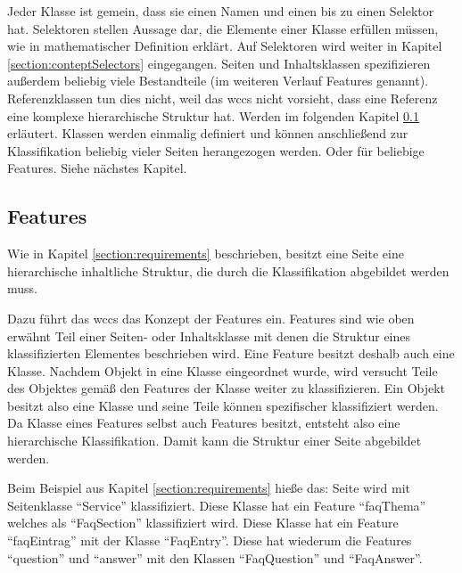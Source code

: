         Jeder Klasse ist gemein, dass sie einen Namen und einen bis zu einen Selektor hat.
        Selektoren stellen Aussage dar, die Elemente einer Klasse erfüllen müssen,
        wie in mathematischer Definition erklärt.
        Auf Selektoren wird weiter in Kapitel \ref{section:conteptSelectors} eingegangen.
        Seiten und Inhaltsklassen spezifizieren außerdem beliebig viele Bestandteile
        (im weiteren Verlauf Features genannt).
        Referenzklassen tun dies nicht, weil das \gls{wccs} nicht vorsieht, dass eine Referenz eine komplexe hierarchische Struktur hat.
        Werden im folgenden Kapitel \ref{section:conceptFeatures} erläutert.
        Klassen werden einmalig definiert und können anschließend zur Klassifikation beliebig vieler Seiten herangezogen werden.
        Oder für beliebige Features. Siehe nächstes Kapitel.

    \subsection{Features}
        \label{section:conceptFeatures}
        Wie in Kapitel \ref{section:requirements} beschrieben, besitzt eine Seite eine
        hierarchische inhaltliche Struktur, die durch die Klassifikation abgebildet werden muss.

        Dazu führt das \gls{wccs} das Konzept der Features ein.
        Features sind wie oben erwähnt Teil einer Seiten- oder Inhaltsklasse
        mit denen die Struktur eines klassifizierten Elementes beschrieben wird.
        Eine Feature besitzt deshalb auch eine Klasse.
        Nachdem Objekt in eine Klasse eingeordnet wurde,
        wird versucht Teile des Objektes gemäß den Features der Klasse weiter zu klassifizieren.
        Ein Objekt besitzt also eine Klasse und seine Teile können spezifischer klassifiziert werden.
        Da Klasse eines Features selbst auch Features besitzt, entsteht also eine hierarchische Klassifikation.
        Damit kann die Struktur einer Seite abgebildet werden.

        Beim Beispiel aus Kapitel \ref{section:requirements} hieße das:
        Seite wird mit Seitenklasse "`Service"' klassifiziert.
        Diese Klasse hat ein Feature "`faqThema"' welches als "`FaqSection"'
        klassifiziert wird.
        Diese Klasse hat ein Feature "`faqEintrag"' mit der Klasse "`FaqEntry"'.
        Diese hat wiederum die Features "`question"' und "`answer"' mit den Klassen
        "`FaqQuestion"' und "`FaqAnswer"'.

